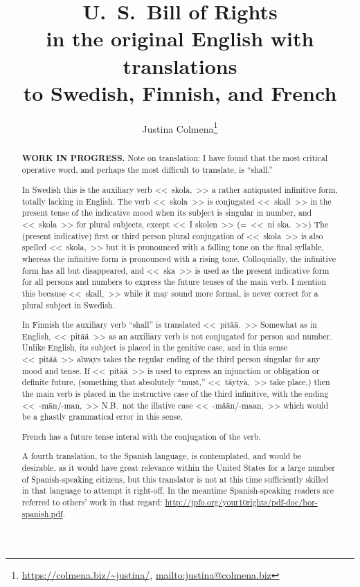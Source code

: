 \documentclass[a4paper,landscape,12pt]{article}
\title{{\huge \textbf{U.~S.\ Bill of Rights}}\\
	in the original English with translations\\
	to Swedish, Finnish, and French}
\author{Justina Colmena\footnote{\url{https://colmena.biz/~justina/}, \url{mailto:justina@colmena.biz}}}
\begin{document}
	
\sloppy\centering
\maketitle
\begin{abstract}
	{\color{red}\textbf{WORK IN PROGRESS.}}  Note on translation:  I have found that the most critical operative word, and perhaps the most difficult to translate, is ``shall.''
	
	In Swedish this is the auxiliary verb \foreignlanguage{swedish}{<<~skola,~>>} a rather antiquated infinitive form, totally lacking in English.  The verb \foreignlanguage{swedish}{<<~skola~>>} is conjugated \foreignlanguage{swedish}{<<~skall~>>} in the present tense of the indicative mood when its subject is singular in number, and \foreignlanguage{swedish}{<<~skola~>>} for plural subjects, except \foreignlanguage{swedish}{<<~I skolen~>> (=~<<~ni ska.~>>)}  The (present indicative) first or third person plural conjugation of \foreignlanguage{swedish}{<<~skola~>>} is also spelled \foreignlanguage{swedish}{<<~skola,~>>} but it is pronounced with a falling tone on the final syllable, whereas the infinitive form is pronounced with a rising tone.  Colloquially, the infinitive form has all but disappeared, and \foreignlanguage{swedish}{<<~ska~>>} is used as the present indicative form for all persons and numbers to express the future tenses of the main verb.  I mention this because \foreignlanguage{swedish}{<<~skall,~>>} while it may sound more formal, is never correct for a plural subject in Swedish.
		
	In Finnish the auxiliary verb ``shall'' is translated \foreignlanguage{finnish}{<<~pitää.~>>}  Somewhat as in English, \foreignlanguage{finnish}{<<~pitää~>>} as an auxiliary verb is not conjugated for person and number.  Unlike English, its subject is placed in the genitive case, and in this sense \foreignlanguage{finnish}{<<~pitää~>>}  always takes the regular ending of the third person singular for any mood and tense.  If \foreignlanguage{finnish}{<<~pitää~>>} is used to express an injunction or obligation or definite future, (something that absolutely ``must,'' \foreignlanguage{finnish}{<<~täytyä,~>>} take place,) then the main verb is placed in the instructive case of the third infinitive, with the ending \foreignlanguage{finnish}{<<~\mbox{-män/-man,}~>>} N.B.\ not the illative case \foreignlanguage{finnish}{<<~\mbox{-mään/-maan,}~>>} which would be a ghastly grammatical error in this sense.

	French has a future tense interal with the conjugation of the verb.
	
	A fourth translation, to the Spanish language, is contemplated, and would be desirable, as it would have great relevance within the United States for a large number of Spanish-speaking citizens, but this translator is not at this time sufficiently skilled in that language to attempt it right-off. In the meantime Spanish-speaking readers are referred to others' work in that regard: \foreignlanguage{spanish}{\url{http://jpfo.org/your10rights/pdf-doc/bor-spanish.pdf}}.
	\end{abstract}
\end{document}
